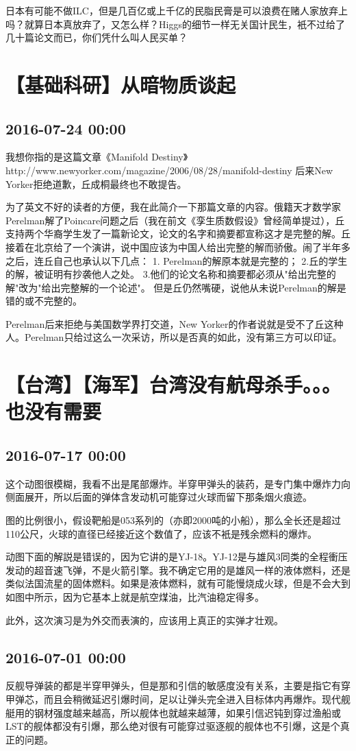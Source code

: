 \documentclass[twocolumn]{ctexart}
\begin{document}
日本有可能不做ILC，但是几百亿或上千亿的民脂民膏是可以浪费在赌人家放弃上吗？就算日本真放弃了，又怎么样？Higgs的细节一样无关国计民生，衹不过给了几十篇论文而已，你们凭什么叫人民买单？\section*{【基础科研】从暗物质谈起}
\subsection*{2016-07-24 00:00}
我想你指的是这篇文章《Manifold Destiny》http://www.newyorker.com/magazine/2006/08/28/manifold-destiny
后来New Yorker拒绝道歉，丘成桐最终也不敢提告。

为了英文不好的读者的方便，我在此简介一下那篇文章的内容。俄籍天才数学家Perelman解了Poincare问题之后（我在前文《孪生质数假设》曾经简单提过），丘支持两个华裔学生发了一篇新论文，论文的名字和摘要都宣称这才是完整的解。丘接着在北京给了一个演讲，说中国应该为中国人给出完整的解而骄傲。闹了半年多之后，连丘自己也承认以下几点：
1. Perelman的解原本就是完整的；
2.丘的学生的解，被证明有抄袭他人之处。
3.他们的论文名称和摘要都必须从"给出完整的解"改为"给出完整解的一个论述"。
但是丘仍然嘴硬，说他从未说Perelman的解是错的或不完整的。

Perelman后来拒绝与美国数学界打交道，New Yorker的作者说就是受不了丘这种人。Perelman只给过这么一次采访，所以是否真的如此，没有第三方可以印证。\section*{【台湾】【海军】台湾没有航母杀手。。。也没有需要}
\subsection*{2016-07-17 00:00}
这个动图很模糊，我看不出是尾部爆炸。半穿甲弹头的装药，是专门集中爆炸力向侧面展开，所以后面的弹体含发动机可能穿过火球而留下那条烟火痕迹。

图的比例很小，假设靶船是053系列的（亦即2000吨的小船），那么全长还是超过110公尺，火球的直径已经接近这个数值了，应该不衹是残余燃料的爆炸。

动图下面的解説是错误的，因为它讲的是YJ-18。YJ-12是与雄风3同类的全程衝压发动的超音速飞弹，不是火箭引擎。我不确定它用的是雄风一样的液体燃料，还是类似法国流星的固体燃料。如果是液体燃料，就有可能慢烧成火球，但是不会大到如图中所示，因为它基本上就是航空煤油，比汽油稳定得多。

此外，这次演习是为外交而表演的，应该用上真正的实弹才壮观。\subsection*{2016-07-01 00:00}
反舰导弹装的都是半穿甲弹头，但是那和引信的敏感度没有关系，主要是指它有穿甲弹芯，而且会稍微延迟引爆时间，足以让弹头完全进入目标体内再爆炸。现代舰艇用的钢材强度越来越高，所以舰体也就越来越薄，如果引信迟钝到穿过渔船或LST的舰体都没有引爆，那么绝对很有可能穿过驱逐舰的舰体也不引爆，这是个真正的问题。
\end{document}
